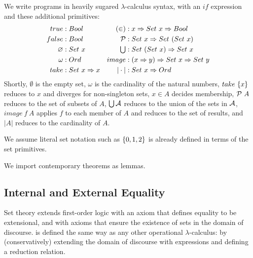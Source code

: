 \documentclass[preprint]{sigplanconf}
\begin{document}
We write \lzfclang programs in heavily sugared $\lambda$-calculus syntax, with an $if$ expression and these additional primitives:
\begin{equation}
\begin{aligned}
	\begin{aligned}
		true &: Bool \\
		false &: Bool \\
		\varnothing &: Set~x \\
		\omega &: Ord \\
		take &: Set~x \Rightarrow x \\
	\end{aligned}
	&\ \ \ 
	\begin{aligned}
		(\in) &: x \Rightarrow Set~x \Rightarrow Bool \\
		\mathcal{P} &: Set~x \Rightarrow Set~(Set~x) \\
		\textstyle\bigcup &: Set~(Set~x) \Rightarrow Set~x \\
		image &: (x \Rightarrow y) \Rightarrow Set~x \Rightarrow Set~y \\
		|\cdot| &: Set~x \Rightarrow Ord \\
	\end{aligned} \\
\end{aligned}
\label{eqn:lzfc-prims}
\end{equation}
Shortly, $\emptyset$ is the empty set, $\omega$ is the cardinality of the natural numbers, $take~\{{x}\}$ reduces to $x$ and diverges for non-singleton sets, $x \in A$ decides membership, $\mathcal{P}~A$ reduces to the set of subsets of $A$, $\textstyle\bigcup\mathcal{A}$ reduces to the union of the sets in $\mathcal{A}$, $image~f~A$ applies $f$ to each member of $A$ and reduces to the set of results, and $|A|$ reduces to the cardinality of $A$.

We assume literal set notation such as $\{{0,1,2}\}$ is already defined in terms of the set primitives.

We import contemporary theorems as lemmas.

\subsection{Internal and External Equality}

Set theory extends first-order logic with an axiom that defines equality to be extensional, and with axioms that ensure the existence of sets in the domain of discourse.
\lzfclang is defined the same way as any other operational $\lambda$-calculus: by (conservatively) extending the domain of discourse with expressions and defining a reduction relation.
\end{document}
